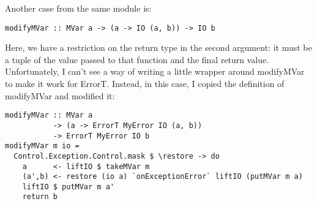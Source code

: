 Another case from the same module is:

\begin{lstlisting}
modifyMVar :: MVar a -> (a -> IO (a, b)) -> IO b
\end{lstlisting}

Here, we have a restriction on the return type in the second argument: it must be a tuple of the value passed to that function and the final return value. Unfortunately, I can't see a way of writing a little wrapper around modifyMVar to make it work for ErrorT. Instead, in this case, I copied the definition of modifyMVar and modified it:

\begin{lstlisting}
modifyMVar :: MVar a
           -> (a -> ErrorT MyError IO (a, b))
           -> ErrorT MyError IO b
modifyMVar m io =
  Control.Exception.Control.mask $ \restore -> do
    a      <- liftIO $ takeMVar m
    (a',b) <- restore (io a) `onExceptionError` liftIO (putMVar m a)
    liftIO $ putMVar m a'
    return b
\end{lstlisting}
